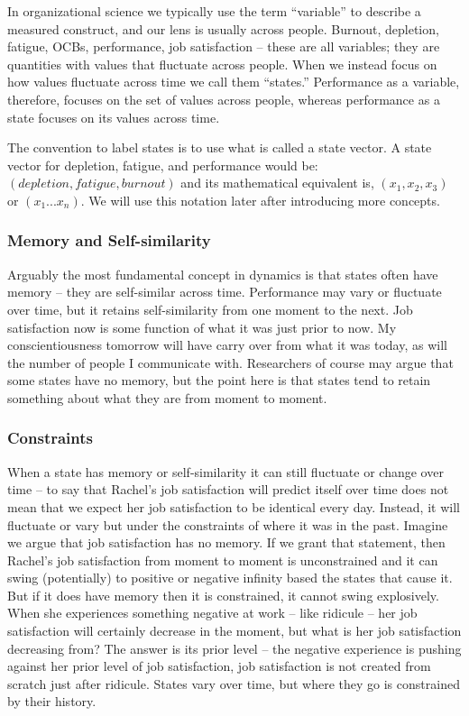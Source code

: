 \documentclass[english,,man]{apa6}
\theoremstyle{definition}
\theoremstyle{definition}
\theoremstyle{definition}
\theoremstyle{remark}
\begin{document}
In organizational science we typically use the term \enquote{variable}
to describe a measured construct, and our lens is usually across people.
Burnout, depletion, fatigue, OCBs, performance, job satisfaction --
these are all variables; they are quantities with values that fluctuate
across people. When we instead focus on how values fluctuate across time
we call them \enquote{states.} Performance as a variable, therefore,
focuses on the set of values across people, whereas performance as a
state focuses on its values across time.

The convention to label states is to use what is called a state vector.
A state vector for depletion, fatigue, and performance would be:
\((depletion, fatigue, burnout)\) and its mathematical equivalent is,
\((x_1, x_2, x_3)\) or \((x_1 ...x_n)\). We will use this notation later
after introducing more concepts.

\hypertarget{memory-and-self-similarity}{%
\subsubsection{Memory and
Self-similarity}\label{memory-and-self-similarity}}

Arguably the most fundamental concept in dynamics is that states often
have memory -- they are self-similar across time. Performance may vary
or fluctuate over time, but it retains self-similarity from one moment
to the next. Job satisfaction now is some function of what it was just
prior to now. My conscientiousness tomorrow will have carry over from
what it was today, as will the number of people I communicate with.
Researchers of course may argue that some states have no memory, but the
point here is that states tend to retain something about what they are
from moment to moment.

\hypertarget{constraints}{%
\subsubsection{Constraints}\label{constraints}}

When a state has memory or self-similarity it can still fluctuate or
change over time -- to say that Rachel's job satisfaction will predict
itself over time does not mean that we expect her job satisfaction to be
identical every day. Instead, it will fluctuate or vary but under the
constraints of where it was in the past. Imagine we argue that job
satisfaction has no memory. If we grant that statement, then Rachel's
job satisfaction from moment to moment is unconstrained and it can swing
(potentially) to positive or negative infinity based the states that
cause it. But if it does have memory then it is constrained, it cannot
swing explosively. When she experiences something negative at work --
like ridicule -- her job satisfaction will certainly decrease in the
moment, but what is her job satisfaction decreasing from? The answer is
its prior level -- the negative experience is pushing against her prior
level of job satisfaction, job satisfaction is not created from scratch
just after ridicule. States vary over time, but where they go is
constrained by their history.
\end{document}
